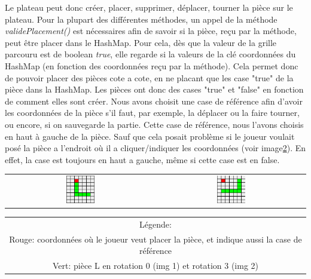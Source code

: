         Le plateau peut donc créer, placer, supprimer, déplacer, tourner la pièce sur le plateau. Pour la plupart des différentes méthodes, un appel de la méthode \textit{validePlacement()\label{txt:validePlacement}} est nécessaires afin de savoir si la pièce, reçu par la méthode, peut être placer dans le HashMap. Pour cela, dès que la valeur de la grille parcouru est de boolean \textit{true}, elle regarde si la valeurs de la clé coordonnées du HashMap (en fonction des coordonnées reçu par la méthode). Cela permet donc de pouvoir placer des pièces cote a cote, en ne placant que les case "true" de la pièce dans la HashMap.
        Les pièces ont donc des cases "true" et "false" en fonction de comment elles sont créer. Nous avons choisit une case de référence afin d'avoir les coordonnées de la pièce s'il faut, par exemple, la déplacer ou la faire tourner, ou encore, si on sauvegarde la partie. Cette case de référence, nous l'avons choisis en haut à gauche de la pièce.
        Sauf que cela posait problème si le joueur voulait posé la pièce a l'endroit où il a cliquer/indiquer les coordonnées (voir image\ref{img:prblmPlacement}). En effet, la case est toujours en haut a gauche, même si cette case est en false.

        \begin{table}[h]\label{img:prblmPlacement}
            \centering
            \begin{tabular}{cc}
                \includegraphics[width=0.20\textwidth, keepaspectratio]{img/pieceLrot0.png} & \includegraphics[width=0.20\textwidth, keepaspectratio]{img/pieceLrot3.png}\\
            \end{tabular}
            \begin{tabular}{c}
                Légende:\\
                Rouge: coordonnées où le joueur veut placer la pièce, et indique aussi la case de référence\\
                Vert: pièce L en rotation 0 (img 1) et rotation 3 (img 2)
            \end{tabular}
       \end{table}


